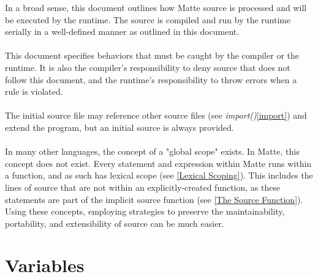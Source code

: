 \documentclass[12pt,letterpaper]{report}
\begin{document}
In a broad sense, this document outlines how Matte source is processed and will be 
executed by the runtime. The source is compiled and run by the runtime serially 
in a well-defined manner as outlined in this document. 
\\\\
This document specifies behaviors that must be caught by the compiler or the 
runtime. It is also the compiler's responsibility to deny source that does not 
follow this document, and the runtime's responsibility to throw errors when 
a rule is violated.
\\\\
The initial source file may reference other source files (see \textit{import()}\autoref{import}) 
and extend the program, but an initial source is always provided.
\\\\
In many other languages, the concept of a "global scope" exists. In Matte, 
this concept does not exist. Every statement and expression within Matte 
runs within a function, and as such has lexical scope (see \autoref{Lexical Scoping}).
This includes the lines of source that are not within an explicitly-created
function, as these statements are part of the implicit source function 
(see \autoref{The Source Function}). Using these concepts, employing strategies 
to preserve the maintainability, portability, and extensibility of source can 
be much easier.





\chapter{Variables}\label{Variables}
\end{document}

